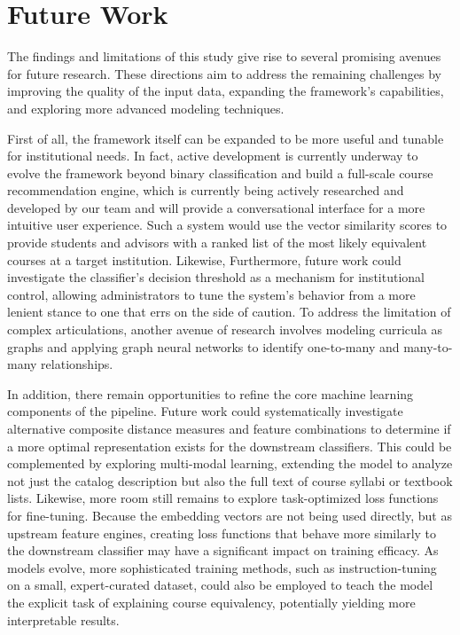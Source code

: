 \section{Future Work}\label{ch:5.3}
The findings and limitations of this study give rise to several promising avenues for future research. These directions aim to address the remaining challenges by improving the quality of the input data, expanding the framework's capabilities, and exploring more advanced modeling techniques.

First of all, the framework itself can be expanded to be more useful and tunable for institutional needs. In fact, active development is currently underway to evolve the framework beyond binary classification and build a full-scale course recommendation engine, which is currently being actively researched and developed by our team and will provide a conversational interface for a more intuitive user experience. Such a system would use the vector similarity scores to provide students and advisors with a ranked list of the most likely equivalent courses at a target institution. Likewise, Furthermore, future work could investigate the classifier's decision threshold as a mechanism for institutional control, allowing administrators to tune the system's behavior from a more lenient stance to one that errs on the side of caution. To address the limitation of complex articulations, another avenue of research involves modeling curricula as graphs and applying graph neural networks to identify one-to-many and many-to-many relationships.

In addition, there remain opportunities to refine the core machine learning components of the pipeline. Future work could systematically investigate alternative composite distance measures and feature combinations to determine if a more optimal representation exists for the downstream classifiers. This could be complemented by exploring multi-modal learning, extending the model to analyze not just the catalog description but also the full text of course syllabi or textbook lists. Likewise, more room still remains to explore task-optimized loss functions for fine-tuning.  Because the embedding vectors are not being used directly, but as upstream feature engines, creating loss functions that behave more similarly to the downstream classifier may have a significant impact on training efficacy.  As models evolve, more sophisticated training methods, such as instruction-tuning on a small, expert-curated dataset, could also be employed to teach the model the explicit task of explaining course equivalency, potentially yielding more interpretable results.

